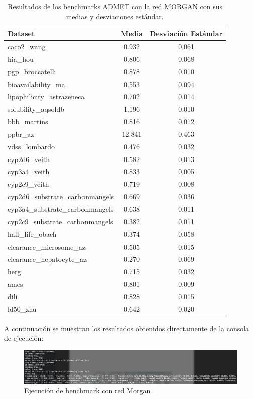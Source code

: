 \begin{table}[ht]
\centering
\label{tab:admet_metrics}
\begin{tabular}{|l|c|c|}
\hline
\textbf{Dataset} & \textbf{Media} & \textbf{Desviación Estándar} \\ \hline
caco2\_wang & 0.932 & 0.061 \\ \hline
hia\_hou & 0.806 & 0.068 \\ \hline
pgp\_broccatelli & 0.878 & 0.010 \\ \hline
bioavailability\_ma & 0.553 & 0.094 \\ \hline
lipophilicity\_astrazeneca & 0.702 & 0.014 \\ \hline
solubility\_aqsoldb & 1.196 & 0.010 \\ \hline
bbb\_martins & 0.816 & 0.012 \\ \hline
ppbr\_az & 12.841 & 0.463 \\ \hline
vdss\_lombardo & 0.476 & 0.032 \\ \hline
cyp2d6\_veith & 0.582 & 0.013 \\ \hline
cyp3a4\_veith & 0.833 & 0.005 \\ \hline
cyp2c9\_veith & 0.719 & 0.008 \\ \hline
cyp2d6\_substrate\_carbonmangels & 0.669 & 0.036 \\ \hline
cyp3a4\_substrate\_carbonmangels & 0.638 & 0.011 \\ \hline
cyp2c9\_substrate\_carbonmangels & 0.382 & 0.011 \\ \hline
half\_life\_obach & 0.374 & 0.058 \\ \hline
clearance\_microsome\_az & 0.505 & 0.015 \\ \hline
clearance\_hepatocyte\_az & 0.270 & 0.069 \\ \hline
herg & 0.715 & 0.032 \\ \hline
ames & 0.801 & 0.009 \\ \hline
dili & 0.828 & 0.015 \\ \hline
ld50\_zhu & 0.642 & 0.020 \\ \hline
\end{tabular}
\caption{Resultados de los benchmarks ADMET con la red MORGAN con sus medias y desviaciones estándar.}
\end{table}

A continuación se muestran los resultados obtenidos directamente de la consola de ejecución:

\begin{figure}
    \centering
    \includegraphics[width=1\linewidth]{fig/Results1.png}
    \caption{Ejecución de benchmark con red Morgan}
    \label{fig:enter-label}
\end{figure}